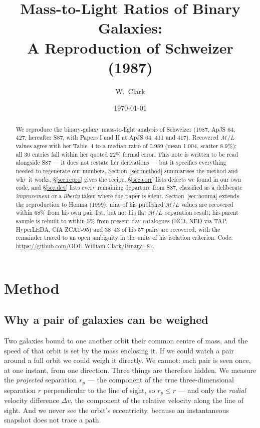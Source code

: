 \documentclass[11pt]{article}
\title{Mass-to-Light Ratios of Binary Galaxies:\\
A Reproduction of Schweizer (1987)}
\author{W.\ Clark}
\date{\today}
\newcommand{\ML}{\ensuremath{\mathcal{M}/L}}
\begin{document}
\maketitle

\begin{abstract}
\noindent
We reproduce the binary-galaxy mass-to-light analysis of Schweizer (1987,
ApJS 64, 427; hereafter S87, with Papers I and II at ApJS 64, 411 and 417).
Recovered \ML{} values agree with her Table~4 to a median ratio of 0.989
(mean 1.004, scatter 8.9\%); all 30 entries fall within her quoted 22\% formal
error. This note is written to be read alongside S87 --- it does not restate
her derivations --- but it specifies everything needed to regenerate our
numbers. Section~\ref{sec:method} summarises the method and why it works,
\S\ref{sec:repro} gives the recipe, \S\ref{sec:corr} lists defects we found in
our own code, and \S\ref{sec:dev} lists every remaining departure from S87,
classified as a deliberate \emph{improvement} or a \emph{liberty} taken where
the paper is silent. Section~\ref{sec:honma} extends the reproduction to
Honma (1999): nine of his published \ML{} values are recovered within 68\%
from his own pair list, but not his flat \ML{}--separation result; his parent
sample is rebuilt to within 5\% from present-day catalogues (RC3, NED via TAP,
HyperLEDA, CfA ZCAT-95) and 38--43 of his 57 pairs are recovered, with the
remainder traced to an open ambiguity in the units of his isolation criterion. Code:
\url{https://github.com/ODU-William-Clark/Binary_87}.
\end{abstract}

\section{Method}
\label{sec:method}

\subsection{Why a pair of galaxies can be weighed}

Two galaxies bound to one another orbit their common centre of mass, and the
speed of that orbit is set by the mass enclosing it. If we could watch a pair
around a full orbit we could weigh it directly. We cannot: each pair is seen
once, at one instant, from one direction. Three things are therefore hidden.
We measure the \emph{projected} separation $r_p$ --- the component of the true
three-dimensional separation $r$ perpendicular to the line of sight, so
$r_p \le r$ --- and only the \emph{radial} velocity difference $\Delta v$, the
component of the relative velocity along the line of sight. And we never see
the orbit's eccentricity, because an instantaneous snapshot does not trace a
path.
\end{document}
